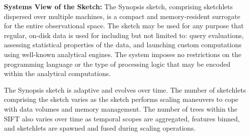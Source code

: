 \textbf{Systems View of the Sketch:} The Synopsis sketch, comprising sketchlets dispersed over multiple machines, is a compact and memory-resident surrogate for the entire observational space. The sketch may be used for any purpose that regular, on-disk data is used for including but not limited to: query evaluations, assessing statistical properties of the data, and launching custom computations using well-known analytical engines. The system imposes no restrictions on the programming language or the type of processing logic that may be encoded within the analytical computations. 

The Synopsis sketch is adaptive and evolves over time. The number of sketchlets comprising the sketch varies as the sketch performs scaling maneuvers to cope with data volumes and memory management. The number of trees within the SIFT  also varies over time as temporal scopes are aggregated, features binned, and sketchlets are spawned and fused during scaling operations.
